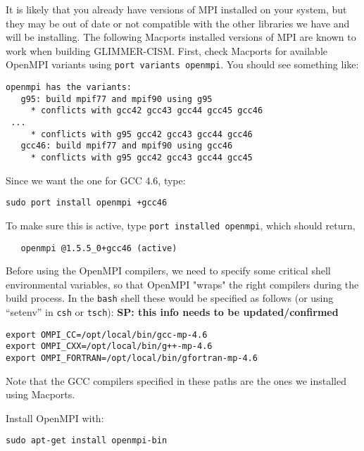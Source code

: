 \begin{mdframed}[style=mac] %
It is likely that you already have versions of MPI installed on your system, 
but they may be out of date or not compatible with the other libraries we have 
and will be installing. The following Macports installed versions of MPI are known 
to work when building  GLIMMER-CISM.
First, check Macports for available OpenMPI variants using \texttt{port variants openmpi}. 
You should see something like:

\begin{verbatim}
openmpi has the variants:
   g95: build mpif77 and mpif90 using g95
     * conflicts with gcc42 gcc43 gcc44 gcc45 gcc46
 ...
     * conflicts with g95 gcc42 gcc43 gcc44 gcc46
   gcc46: build mpif77 and mpif90 using gcc46
     * conflicts with g95 gcc42 gcc43 gcc44 gcc45
\end{verbatim}

Since we want the one for GCC 4.6, type:

\texttt{sudo port install openmpi +gcc46}

To make sure this is active, type \texttt{port installed openmpi}, which should return, 

\begin{verbatim}
   openmpi @1.5.5_0+gcc46 (active)
\end{verbatim}

Before using the OpenMPI compilers, we need to 
specify some critical shell environmental variables, so that OpenMPI "wraps" the right 
compilers during the build process. In the \texttt{bash} shell these would be specified 
as follows (or using ``setenv'' in \texttt{csh} or \texttt{tsch}): 
\textbf{SP: this info needs to be updated/confirmed}

\begin{verbatim}
export OMPI_CC=/opt/local/bin/gcc-mp-4.6
export OMPI_CXX=/opt/local/bin/g++-mp-4.6
export OMPI_FORTRAN=/opt/local/bin/gfortran-mp-4.6
\end{verbatim}

Note that the GCC compilers specified in these paths are the ones we installed using Macports. 

\end{mdframed}              %



\begin{mdframed}[style=ubuntu] %
Install OpenMPI with:

\texttt{sudo apt-get install openmpi-bin}
\end{mdframed}                 %



